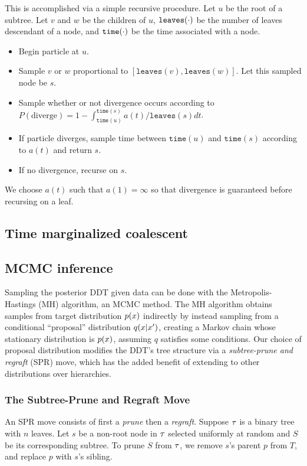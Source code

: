 This is accomplished via a simple recursive procedure.
Let $u$ be the root of a subtree. 
Let $v$ and $w$
be the children of $u$, $\tt{leaves}(\cdot)$ 
be the number of leaves descendant of a node,
and $\tt{time}(\cdot)$ be the time associated with a node.
\begin{itemize}
\item Begin particle at $u$.
\item Sample $v$ or $w$ proportional to $[\texttt{leaves}(v), \texttt{leaves}(w)]$. Let this
sampled node be $s$.
\item Sample whether or not divergence occurs according to $P(\text{diverge}) = 1 - \int_{\texttt{time}(u)}^{\texttt{time}(s)} a(t)/ \texttt{leaves}(s) dt$.
\item If particle diverges, sample time between $\texttt{time}(u)$ and $\texttt{time}(s)$
according to $a(t)$ and return $s$.
\item If no divergence, recurse on $s$.
\end{itemize}
We choose $a(t)$ such that $a(1) = \infty$ so that
divergence is guaranteed before recursing on a leaf.

\subsection{Time marginalized coalescent}

\subsection{MCMC inference}
Sampling the posterior
DDT given data can be done with the
Metropolis-Hastings (MH) algorithm,
an MCMC method.
The MH algorithm 
obtains samples from target distribution $p(x)$
indirectly by instead sampling
from a conditional ``proposal'' distribution $q(x | x')$,
creating a Markov chain whose stationary
distribution is $p(x)$, assuming $q$ satisfies some conditions.
Our choice of proposal distribution
modifies the DDT's tree structure
via a \emph{subtree-prune and regraft} (SPR) move,
which has the added benefit of extending to
other distributions over hierarchies.


\subsubsection*{The Subtree-Prune and Regraft Move}
\label{app:sprsampler}
An SPR move consists of first a \emph{prune} then a \emph{regraft}.
Suppose $\tau$ is a binary tree with $n$ leaves.
Let $s$ be a non-root node in $\tau$ 
selected uniformly at random and
$S$ be its corresponding subtree.
To prune $S$ from $\tau$, we 
remove $s$'s parent $p$
from $T$, and replace $p$ with $s$'s sibling.

